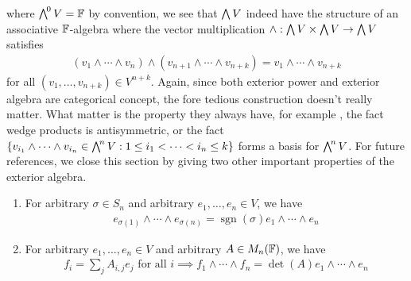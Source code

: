 \documentclass{report}
\begin{document}
where $\extp^0V= \F$ by convention, we see that $\extp V$ indeed have the structure of an associative $\mathbb{F}$-algebra where the vector multiplication $\wedge  :\extp V \times \extp V \rightarrow \extp V $ satisfies 
\begin{align}
\label{vm}
  (v_1 \wedge  \cdots \wedge  v_n  ) \wedge  (v_{n+1}\wedge  \cdots \wedge  v_{n+k})= v_1 \wedge  \cdots \wedge  v_{n+k}   
\end{align}
for all $(v_1,\dots ,v_{n+k})\in V^{n+k}$. Again, since both exterior power and exterior algebra are categorical concept, the fore tedious construction doesn't really matter. What matter is the property they always have, for example , the fact wedge products is antisymmetric, or the fact $\set{v_{i_1}\wedge  \cdots \wedge  v_{i_n} \in \extp^n V: 1\leq i_1 < \cdots < i_n \leq k  }$ forms a basis for $\extp^n V$. For future references, we close this section by giving two other important properties of the exterior algebra. 
\begin{enumerate}[label=(\alph*)]
  \item For arbitrary $\sigma \in S_n$ and arbitrary $e_1, \dots ,e_n \in V$, we have 
    \begin{align*}
    e_{\sigma (1)}\wedge  \cdots \wedge  e_{\sigma (n)}=  \operatorname{sgn}(\sigma)e_1 \wedge \cdots \wedge  e_{n}  
    \end{align*}  
  \item For arbitrary $e_1, \dots ,e_n \in V$ and arbitrary $A \in M_n(\mathbb{F})$, we have  
    \begin{align*}
    f_i=  \sum_j A_{i,j}e_j \text{ for all }i\implies f_1\wedge  \cdots \wedge  f_n = \operatorname{det}(A) e_1 \wedge  \cdots \wedge  e_n    
    \end{align*}
\end{enumerate}
\end{document}
